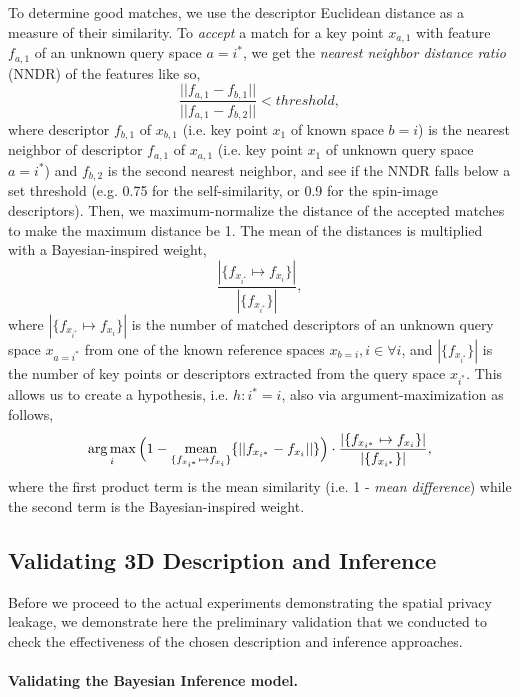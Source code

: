 To determine good matches, we use the descriptor Euclidean distance as a measure of their similarity. To \textit{accept} a match for a key point $x_{a,1}$ with feature $f_{a,1}$ of an unknown query space $a = i^*$, we get the \textit{nearest neighbor distance ratio} (NNDR) of the features like so,
\begin{equation}
\frac{||f_{a,1} - f_{b,1}||}{||f_{a,1} - f_{b,2}||} < threshold,
\label{eq:nndr}
\end{equation}
where descriptor $f_{b,1}$ of $x_{b,1}$ (i.e. key point $x_1$ of known space $b = i$) is the nearest neighbor of descriptor $f_{a,1}$ of $x_{a,1}$ (i.e. key point $x_1$ of unknown query space $a = i^*$) and $f_{b,2}$ is the second nearest neighbor, and see if the NNDR falls below a set threshold (e.g. 0.75 for the self-similarity, or 0.9 for the spin-image descriptors). Then, we maximum-normalize the distance of the accepted matches to make the maximum distance be 1. The mean of the distances is multiplied with a Bayesian-inspired weight,
\[
\frac{| \{f_{x_{i^*}} \mapsto f_{x_{i}}\} |}{|\{ f_{x_{i^*}}\}|} ,
\]
where $| \{f_{x_{i^*}} \mapsto f_{x_{i}}\} |$ is the number of matched descriptors of an unknown query space $x_{a = i^*}$ from one of the known reference spaces $x_{b = i}, i \in {\forall i}$, and $|\{ f_{x_{i^*}}\}|$ is the number of key points or descriptors extracted from the query space $x_{i^*}$. This allows us to create a hypothesis, i.e. $h: i^* = i$, also via argument-maximization as follows,
\begin{equation}
\operatorname*{arg\,max}_{i}  \Big(1-\operatorname*{mean}_{\{f_{x_{i^*}} \mapsto f_{x_{i}}\}} \{||f_{x_{i^*}} - f_{x_i}||\}\Big) \cdot \frac{| \{f_{x_{i^*}} \mapsto f_{x_{i}}\} |}{|\{ f_{x_{i^*}}\}|},
\label{eq:matching}
\end{equation}
where the first product term is the mean similarity (i.e. 1 -\textit{ mean difference}) while the second term is the Bayesian-inspired weight.

\subsection{Validating 3D Description and Inference}\label{subsec:inference-validation}
Before we proceed to the actual experiments demonstrating the spatial privacy leakage, we demonstrate here the preliminary validation that we conducted to check the effectiveness of the chosen description and inference approaches.

\paragraph{Validating the Bayesian Inference model.}

